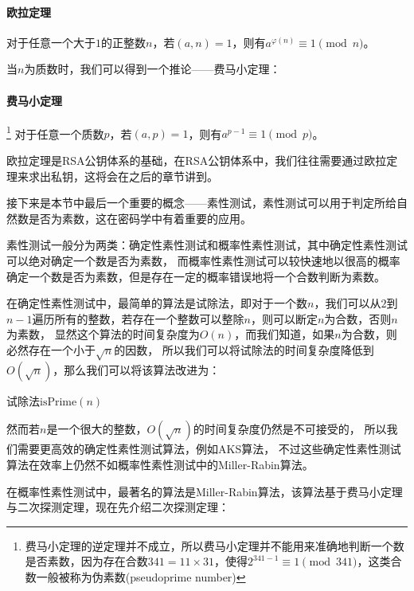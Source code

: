 \documentclass{article}
\numberwithin{equation}{subsubsection}
\begin{document}
\paragraph{\textbf{欧拉定理}}
对于任意一个大于$1$的正整数$n$，若$(a,n)=1$，则有$a^{\varphi(n)}\equiv 1\pmod{n}$。\par
当$n$为质数时，我们可以得到一个推论——费马小定理：
\paragraph{\textbf{费马小定理}}\footnote{费马小定理的逆定理并不成立，所以费马小定理并不能用来准确地判断一个数是否素数，因为存在合数$341=11\times31$，使得$2^{341-1}\equiv 1\pmod{341}$，这类合数一般被称为伪素数(pseudoprime number)}
对于任意一个质数$p$，若$(a,p)=1$，则有$a^{p-1}\equiv 1\pmod{p}$。\par
欧拉定理是RSA公钥体系的基础，在RSA公钥体系中，我们往往需要通过欧拉定理来求出私钥，这将会在之后的章节讲到。\par
接下来是本节中最后一个重要的概念——素性测试，素性测试可以用于判定所给自然数是否为素数，这在密码学中有着重要的应用。\par
素性测试一般分为两类：确定性素性测试和概率性素性测试，其中确定性素性测试可以绝对确定一个数是否为素数，
而概率性素性测试可以较快速地以很高的概率确定一个数是否为素数，但是存在一定的概率错误地将一个合数判断为素数。\par
在确定性素性测试中，最简单的算法是试除法，即对于一个数$n$，我们可以从$2$到$n-1$遍历所有的整数，若存在一个整数可以整除$n$，则可以断定$n$为合数，否则$n$为素数，
显然这个算法的时间复杂度为$O(n)$，而我们知道，如果$n$为合数，则必然存在一个小于$\sqrt{n}$的因数，
所以我们可以将试除法的时间复杂度降低到$O(\sqrt{n})$，那么我们可以将该算法改进为：
\begin{algorithm}
    \caption{试除法$\text{isPrime}(n)$}
\end{algorithm}\par
然而若$n$是一个很大的整数，$O(\sqrt{n})$的时间复杂度仍然是不可接受的，
所以我们需要更高效的确定性素性测试算法，例如AKS算法，
不过这些确定性素性测试算法在效率上仍然不如概率性素性测试中的Miller-Rabin算法。\par
在概率性素性测试中，最著名的算法是Miller-Rabin算法，该算法基于费马小定理与二次探测定理，现在先介绍二次探测定理：
\end{document}
